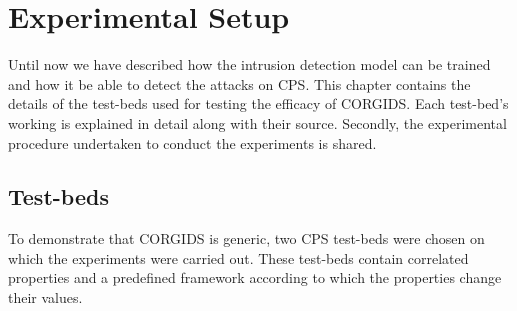 
\chapter{\textbf{Experimental Setup}}
\label{sec4:ExperimentalDetail}

Until now we have described how the intrusion detection model can be trained and how it be able to detect the attacks on \ac{CPS}. This chapter contains the details of the test-beds used for testing the efficacy of \ac{CORGIDS}. Each test-bed's working is explained in detail along with their source. Secondly, the experimental procedure undertaken to conduct the experiments is shared. 

\section{Test-beds}
To demonstrate that \ac{CORGIDS} is generic, two \ac{CPS} test-beds were chosen on which the experiments were carried out. These test-beds contain correlated properties and a predefined framework according to which the properties change their values. 

